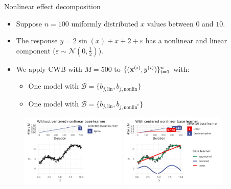 \documentclass[11pt,compress,t,notes=noshow, xcolor=table]{beamer}
\begin{document}
\begin{vbframe}{Nonlinear effect decomposition}

\begin{itemize}
    \item 
        Suppose $n = 100$ uniformly distributed $x$ values between $0$ and $10$.

    \item 
        The response $y = 2\sin(x) + x + 2 + \varepsilon$ has a nonlinear and linear component ($\varepsilon \sim \mathcal{N}(0,\frac{1}{2})$).

    \item
        We apply CWB with $M = 500$ to $\{(\mathbf{x}^{(i)}, y^{(i)})\}_{i=1}^{n}$ with:
        \begin{itemize}
            \item One model with $\mathcal{B} = \{b_{j,\text{lin}}, b_{j,\text{nonlin}}\}$
            \item One model with $\mathcal{B} = \{b_{j,\text{lin}}, b_{j,\text{nonlin}^c}\}$
        \end{itemize}
\end{itemize}

\begin{figure}
    \centering
    \includegraphics[width=0.45\textwidth]{figure/fig-decomp1.png}
    \hfill\includegraphics[width=0.45\textwidth]{figure/fig-decomp2.png}
\end{figure}

\end{vbframe}


\end{document}
